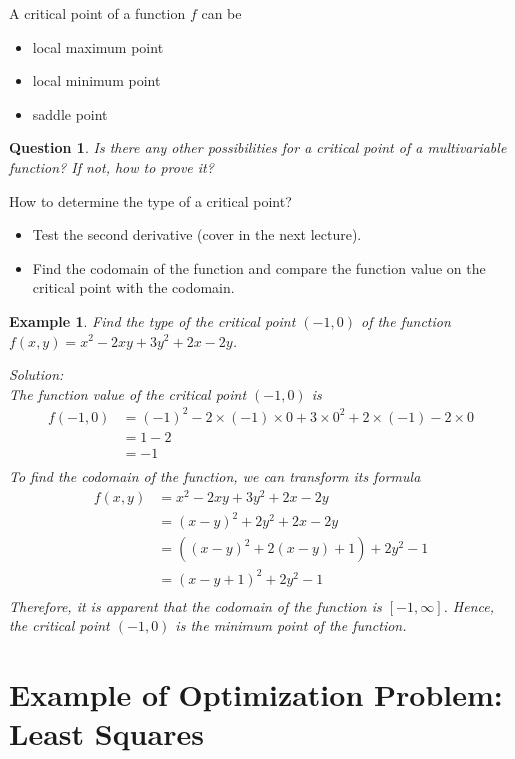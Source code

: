 \documentclass{article}
\newtheorem{example}{Example}
\newtheorem{question}{Question}
\begin{document}
A critical point of a function $f$ can be 
\begin{itemize}
  \item local maximum point
  \item local minimum point
  \item saddle point
\end{itemize}

\begin{question}
  Is there any other possibilities for a critical point of a multivariable 
  function? If not, how to prove it?
\end{question}

How to determine the type of a critical point?
\begin{itemize}
  \item Test the second derivative (cover in the next lecture).
  \item Find the codomain of the function and compare the function value on the 
  critical point with the codomain.
\end{itemize}

\begin{example}
  Find the type of the critical point $(-1, 0)$ of the function 
  $f(x, y) = x^2 - 2xy + 3y^2 + 2x - 2y$.

  Solution: \\
  The function value of the critical point $(-1, 0)$ is 
  \begin{equation*}
    \begin{split}
      f(-1, 0) &= (-1)^2 - 2 \times (-1) \times 0 + 3 \times 0^2 + 2 \times (-1) - 2 \times 0 \\
               &= 1 - 2 \\
               &= -1 \\
    \end{split}
  \end{equation*}
  To find the codomain of the function, we can transform its formula
  \begin{equation*}
    \begin{split}
      f(x, y) &= x^2 - 2xy + 3y^2 + 2x - 2y \\
              &= (x - y)^2 + 2y^2 + 2x - 2y \\
              &= ((x - y)^2 + 2(x - y) + 1) + 2y^2 - 1 \\
              &= (x - y + 1)^2 + 2y^2 - 1 \\
    \end{split}
  \end{equation*}
  Therefore, it is apparent that the codomain of the function is $[-1, \infty]$. 
  Hence, the critical point $(-1, 0)$ is the minimum point of the function.
\end{example}

\section{Example of Optimization Problem: Least Squares}
\end{document}
